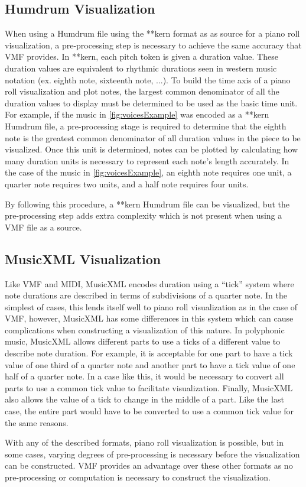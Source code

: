 \subsection{Humdrum Visualization}

When using a Humdrum file using the **kern format as as source for a piano roll visualization, a pre-processing step is necessary to achieve the same accuracy that VMF provides. In **kern, each pitch token is given a duration value. These duration values are equivalent to rhythmic durations seen in western music notation (ex. eighth note, sixteenth note, ...). To build the time axis of a piano roll visualization and plot notes, the largest common denominator of all the duration values to display must be determined to be used as the basic time unit. For example, if the music in \ref{fig:voicesExample} was encoded as a **kern Humdrum file, a pre-processing stage is required to determine that the eighth note is the greatest common denominator of all duration values in the piece to be visualized. Once this unit is determined, notes can be plotted by calculating how many duration units is necessary to represent each note's length accurately. In the case of the music in \ref{fig:voicesExample}, an eighth note requires one unit, a quarter note requires two units, and a half note requires four units.

By following this procedure, a **kern Humdrum file can be visualized, but the pre-processing step adds extra complexity which is not present when using a VMF file as a source.

\subsection{MusicXML Visualization}

Like VMF and MIDI, MusicXML encodes duration using a ``tick'' system where note durations are described in terms of subdivisions of a quarter note. In the simplest of cases, this lends itself well to piano roll visualization as in the case of VMF, however, MusicXML has some differences in this system which can cause complications when constructing a visualization of this nature. In polyphonic music, MusicXML allows different parts to use a ticks of a different value to describe note duration. For example, it is acceptable for one part to have a tick value of one third of a quarter note and another part to have a tick value of one half of a quarter note. In a case like this, it would be necessary to convert all parts to use a common tick value to facilitate visualization. Finally, MusicXML also allows the value of a tick to change in the middle of a part. Like the last case, the entire part would have to be converted to use a common tick value for the same reasons.

With any of the described formats, piano roll visualization is possible, but in some cases, varying degrees of pre-processing is necessary before the visualization can be constructed. VMF provides an advantage over these other formats as no pre-processing or computation is necessary to construct the visualization.
